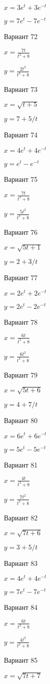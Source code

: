 \documentclass[11pt]{report}
\begin{document}
$x = 3 e^{t} + 3 e^{- t}$

$y = 7 e^{t} - 7 e^{- t}$

Вариант 72

$x = \frac{7 t}{t^{3} + 8}$

$y = \frac{2 t^{2}}{t^{3} + 8}$

Вариант 73

$x = \sqrt{t + 5}$

$y = 7 + 5 / t$

Вариант 74

$x = 4 e^{t} + 4 e^{- t}$

$y = e^{t} - e^{- t}$

Вариант 75

$x = \frac{7 t}{t^{3} + 8}$

$y = \frac{5 t^{2}}{t^{3} + 8}$

Вариант 76

$x = \sqrt{5 t + 1}$

$y = 2 + 3 / t$

Вариант 77

$x = 2 e^{t} + 2 e^{- t}$

$y = 2 e^{t} - 2 e^{- t}$

Вариант 78

$x = \frac{6 t}{t^{3} + 8}$

$y = \frac{6 t^{2}}{t^{3} + 8}$

Вариант 79

$x = \sqrt{5 t + 6}$

$y = 4 + 7 / t$

Вариант 80

$x = 6 e^{t} + 6 e^{- t}$

$y = 5 e^{t} - 5 e^{- t}$

Вариант 81

$x = \frac{4 t}{t^{3} + 8}$

$y = \frac{7 t^{2}}{t^{3} + 8}$

Вариант 82

$x = \sqrt{7 t + 6}$

$y = 3 + 5 / t$

Вариант 83

$x = 4 e^{t} + 4 e^{- t}$

$y = 7 e^{t} - 7 e^{- t}$

Вариант 84

$x = \frac{6 t}{t^{3} + 8}$

$y = \frac{4 t^{2}}{t^{3} + 8}$

Вариант 85

$x = \sqrt{7 t + 7}$
\end{document}
